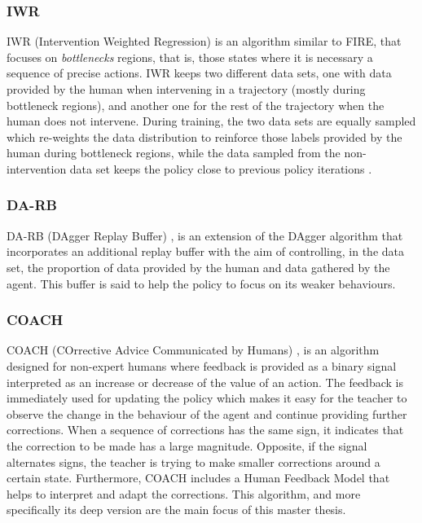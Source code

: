 \subsubsection*{IWR}
IWR (Intervention Weighted Regression) \cite{IWR-mandlekar:2020} is an algorithm similar to FIRE, that focuses on \textit{bottlenecks} regions, that is, those states where it is necessary a sequence of precise actions. IWR keeps two different data sets, one with data provided by the human when intervening in a trajectory (mostly during bottleneck regions), and another one for the rest of the trajectory when the human does not intervene. During training, the two data sets are equally sampled which re-weights  the data distribution to reinforce those labels provided by the human  during bottleneck regions, while the data sampled from the non-intervention data set
keeps the policy close to previous policy iterations \cite{IWR-mandlekar:2020} .



\subsubsection*{DA-RB}
DA-RB (DAgger Replay Buffer) \cite{DA-RB-Prakash:2020}, is an extension of the DAgger algorithm \cite{DAgger-Ross:2011} that incorporates an additional replay buffer with the aim of controlling, in the data set, the proportion of data provided by the human and data gathered by the agent. This buffer is said to help the policy to focus on its weaker behaviours.




 
 \subsubsection*{COACH}
COACH (COrrective Advice Communicated by Humans) \cite{COACH-Celemin-Ruiz-del-Solar:2015}, is an algorithm designed for non-expert humans where feedback is provided as a binary signal interpreted as an increase or decrease of the value of an action.  The feedback is immediately used for updating the policy which makes it easy for the teacher to observe the change in the behaviour of the agent and continue providing further corrections. When a sequence of corrections has the same sign, it indicates that the correction to be made has a large magnitude. Opposite, if the signal alternates signs, the teacher is trying to make smaller corrections around a certain state. Furthermore, COACH includes a Human Feedback Model that helps to interpret and adapt the corrections.
This algorithm, and more specifically its deep version \cite{D-COACH-Dattari-Celemin-Ruiz-del-Solar-Kober:2018} are the main focus of this master thesis.


